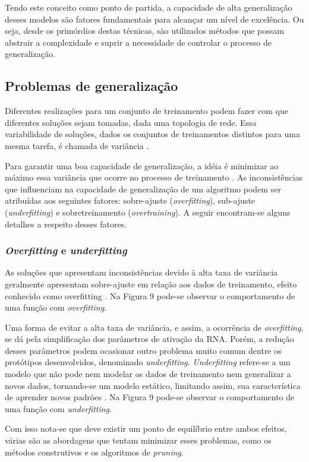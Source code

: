 Tendo este conceito como ponto de partida, a capacidade de alta generalização desses modelos são fatores fundamentais para alcançar um nível de excelência. Ou seja, desde os primórdios destas técnicas, são utilizados métodos que possam abstrair a complexidade e suprir a necessidade de controlar o processo de generalização.

\subsection{Problemas de generalização}
 Diferentes realizações para um conjunto de treinamento podem fazer com que diferentes soluções sejam tomadas, dada uma topologia de rede. Essa variabilidade de soluções, dados os conjuntos de treinamentos distintos para uma mesma tarefa, é chamada de variância \cite{haykin2000}.
 
Para garantir uma boa capacidade de generalização, a idéia é minimizar ao máximo essa variância que ocorre no processo de treinamento \cite{medeiros}. As inconsistências que influenciam  na capacidade de generalização de um algoritmo podem ser atribuídas aos seguintes fatores: sobre-ajuste (\textit{overfitting}), sub-ajuste (\textit{underfitting}) e sobretreinamento (\textit{overtraining}). A seguir encontram-se alguns detalhes a respeito desses fatores.

\subsubsection{\textit{Overfitting} e \textit{underfitting}}
As soluções que apresentam inconsistências devido à alta taxa de variância geralmente apresentam sobre-ajuste em relação aos dados de treinamento, efeito conhecido como overfitting \cite{medeiros}. Na Figura 9 pode-se observar o comportamento de uma função com \textit{overfitting}.

Uma forma de evitar a alta taxa de variância, e assim, a ocorrência de \textit{overfitting}, se dá pela simplificação dos parâmetros de ativação da RNA. Porém, a redução desses parâmetros podem ocasionar outro problema muito comum dentre os protótipos desenvolvidos, denominado \textit{underfitting}. \textit{Underfitting} refere-se a um modelo que não pode nem modelar os dados de treinamento nem generalizar a novos dados, tornando-se um modelo estático, limitando assim, sua característica de aprender novos padrões \cite{geman}. Na Figura 9 pode-se observar o comportamento de uma função com \textit{underfitting}.

Com isso nota-se que deve existir um ponto de equilíbrio entre ambos efeitos, várias são as abordagens que tentam minimizar esses problemas, como os métodos construtivos e os algoritmos de \textit{pruning}.

